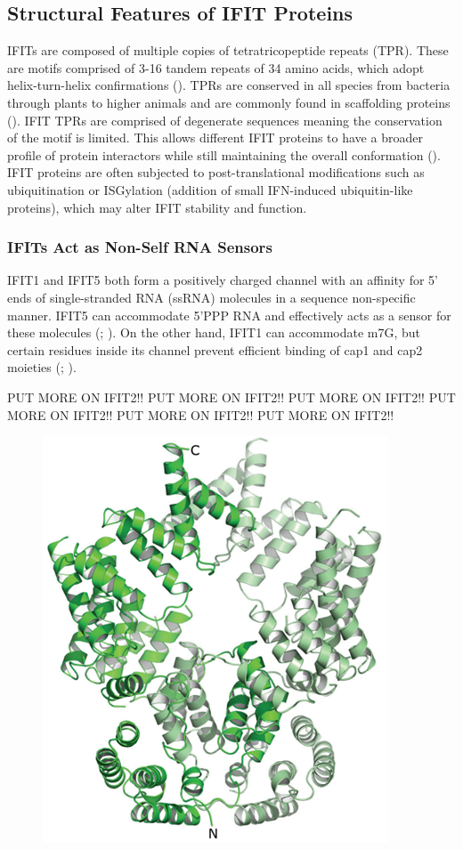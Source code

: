 \subsection{Structural Features of IFIT Proteins} \label{subsec:Structural Features of IFIT Proteins}
IFITs are composed of multiple copies of tetratricopeptide repeats (TPR). These are motifs comprised of 3-16 tandem repeats of 34 amino acids, which adopt helix-turn-helix confirmations (\cite{DAndrea2003TPRHelix}). TPRs are conserved in all species from bacteria through plants to higher animals and are commonly found in scaffolding proteins (\cite{Vladimer2014IFITs:Proteins}). IFIT TPRs are comprised of degenerate sequences meaning the conservation of the motif is limited. This allows different IFIT proteins to have a broader profile of protein interactors while still maintaining the overall conformation (\cite{Fensterl2015Interferon-InducedPathogenesis}). IFIT proteins are often subjected to post-translational modifications such as ubiquitination or ISGylation (addition of small IFN-induced ubiquitin-like proteins), which may alter IFIT stability and function.




\subsubsection{IFITs Act as Non-Self RNA Sensors} \label{IFITs Act as Non-Self RNA Sensors}
IFIT1 and IFIT5 both form a positively charged channel with an affinity for 5' ends of single-stranded RNA (ssRNA) molecules in a sequence non-specific manner. IFIT5 can accommodate 5'PPP RNA and effectively acts as a sensor for these molecules (\cite{Abbas2013StructuralProteins}; \cite{Pichlmair2011IFIT1RNA}). On the other hand, IFIT1 can accommodate m7G, but certain residues inside its channel prevent efficient binding of cap1 and cap2 moieties (\cite{Diamond2014IFIT1:Translation}; \cite{Mears2018BetterResponse}). 

PUT MORE ON IFIT2!! PUT MORE ON IFIT2!! PUT MORE ON IFIT2!! PUT MORE ON IFIT2!! PUT MORE ON IFIT2!! PUT MORE ON IFIT2!! 

\begin{figure}
    \centering
    \includegraphics[width=0.25\linewidth]{04. Introduction//Figs/03. IFIT2-structure.png}
    
    
\end{figure}

